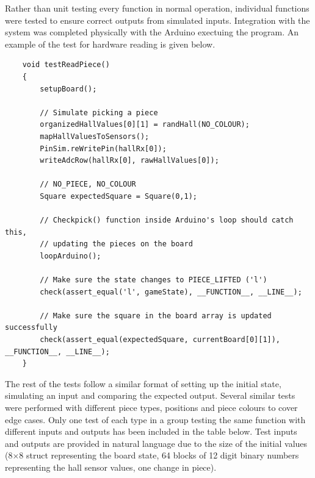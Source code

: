 \documentclass[12pt, titlepage]{article}
\begin{document}
  Rather than unit testing every function in normal operation, individual functions were tested to ensure correct outputs from simulated inputs. Integration 
  with the system was completed physically with the Arduino exectuing the program. An example of the test for hardware reading is given below. 
  \newpage 
\begin{lstlisting}
    void testReadPiece()
    {
        setupBoard(); 
        
        // Simulate picking a piece 
        organizedHallValues[0][1] = randHall(NO_COLOUR);  
        mapHallValuesToSensors(); 
        PinSim.reWritePin(hallRx[0]); 
        writeAdcRow(hallRx[0], rawHallValues[0]); 

        // NO_PIECE, NO_COLOUR 
        Square expectedSquare = Square(0,1);    

        // Checkpick() function inside Arduino's loop should catch this,
        // updating the pieces on the board 
        loopArduino();  

        // Make sure the state changes to PIECE_LIFTED ('l')
        check(assert_equal('l', gameState), __FUNCTION__, __LINE__);  

        // Make sure the square in the board array is updated successfully
        check(assert_equal(expectedSquare, currentBoard[0][1]), __FUNCTION__, __LINE__);  
    }
\end{lstlisting}

  The rest of the tests follow a similar format of setting up the initial state, simulating an input and comparing the expected output. Several similar tests were 
  performed with different piece types, positions and piece colours to cover edge cases. Only one test of each type in a group testing the same function with 
  different inputs and outputs has been included in the table below. Test inputs and outputs are provided in natural language due to the size of the initial values 
  (8$\times$8 struct representing the board state, 64 blocks of 12 digit binary numbers representing the hall sensor values, one change in piece).
\end{document}
